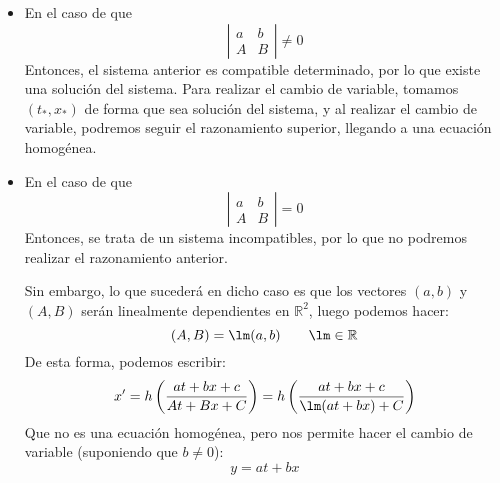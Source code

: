 \begin{itemize}
    \item En el caso de que
        \begin{equation*}
            \left|\begin{array}{cc}
                a & b \\
                A & B
            \end{array}\right| \neq 0
        \end{equation*}
        Entonces, el sistema anterior es compatible determinado, por lo que existe una solución del sistema. Para realizar el cambio de variable, tomamos $(t_*,x_*)$ de forma que sea solución del sistema, y al realizar el cambio de variable, podremos seguir el razonamiento superior, llegando a una ecuación homogénea.
    \item En el caso de que
        \begin{equation*}
            \left|\begin{array}{cc}
                a & b \\
                A & B
            \end{array}\right| = 0
        \end{equation*}
        Entonces, se trata de un sistema incompatibles, por lo que no podremos realizar el razonamiento anterior.

        Sin embargo, lo que sucederá en dicho caso es que los vectores $(a,b)$ y $(A,B)$ serán linealmente dependientes en $\mathbb{R}^2$, luego podemos hacer:
        \begin{equation*}
            (A,B) = \lm(a,b) \qquad \lm \in \mathbb{R}
        \end{equation*}
        De esta forma, podemos escribir:
        \begin{equation*}
            x' = h\left(\dfrac{at + bx + c}{At + Bx + C}\right) =  h\left(\dfrac{at + bx + c}{\lm(at+bx)+C}\right) 
        \end{equation*}
        Que no es una ecuación homogénea, pero nos permite hacer el cambio de variable (suponiendo que $b\neq 0$):
    \begin{equation*}
        y = at + bx 
    \end{equation*}
\end{itemize}

